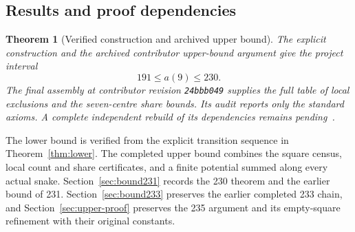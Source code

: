 \documentclass[11pt,a4paper]{article}
\newtheorem{theorem}{Theorem}[section]
\theoremstyle{definition}
\theoremstyle{remark}
\begin{document}
\subsection{Results and proof dependencies}
\begin{theorem}[Verified construction and archived upper bound]\label{thm:main}
The explicit construction and the archived contributor upper-bound argument
give the project interval
\[
\boxed{191\le a(9)\le230.}
\]
The final assembly at contributor revision \texttt{24bbb049} supplies
the full table of local exclusions and the seven-centre share bounds.
Its audit reports only the standard axioms. A complete independent
rebuild of its dependencies remains pending~\cite{bound230archive}.
\end{theorem}
The lower bound is verified from the explicit transition sequence in
Theorem~\ref{thm:lower}. The completed upper bound combines the square
census, local count and share certificates, and a finite potential summed
along every actual snake. Section~\ref{sec:bound231} records the 230 theorem and the earlier bound of 231. Section~\ref{sec:bound233} preserves the earlier completed
233 chain, and Section~\ref{sec:upper-proof} preserves the 235 argument
and its empty-square refinement with their original constants.
\end{document}
